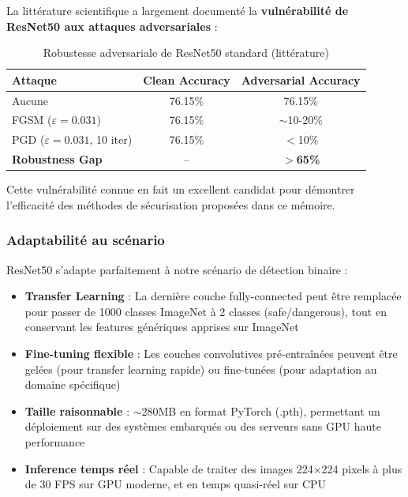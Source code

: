 La littérature scientifique a largement documenté la \textbf{vulnérabilité de ResNet50 aux attaques adversariales} :

\begin{table}[h]
\centering
\caption{Robustesse adversariale de ResNet50 standard (littérature)}
\label{tab:resnet50_vulnerability}
\begin{tabular}{|l|c|c|}
\hline
\textbf{Attaque} & \textbf{Clean Accuracy} & \textbf{Adversarial Accuracy} \\ \hline
Aucune & 76.15\% & 76.15\% \\ \hline
FGSM ($\varepsilon=0.031$) & 76.15\% & $\sim$10-20\% \\ \hline
PGD ($\varepsilon=0.031$, 10 iter) & 76.15\% & $<$10\% \\ \hline
\textbf{Robustness Gap} & -- & \textbf{$>$65\%} \\ \hline
\end{tabular}
\end{table}

Cette vulnérabilité connue en fait un excellent candidat pour démontrer l'efficacité des méthodes de sécurisation proposées dans ce mémoire.


\subsubsection{Adaptabilité au scénario}

ResNet50 s'adapte parfaitement à notre scénario de détection binaire :

\begin{itemize}
    \item \textbf{Transfer Learning} : La dernière couche fully-connected peut être remplacée pour passer de 1000 classes ImageNet à 2 classes (safe/dangerous), tout en conservant les features génériques apprises sur ImageNet
    \item \textbf{Fine-tuning flexible} : Les couches convolutives pré-entraînées peuvent être gelées (pour transfer learning rapide) ou fine-tunées (pour adaptation au domaine spécifique)
    \item \textbf{Taille raisonnable} : $\sim$280MB en format PyTorch (.pth), permettant un déploiement sur des systèmes embarqués ou des serveurs sans GPU haute performance
    \item \textbf{Inference temps réel} : Capable de traiter des images 224×224 pixels à plus de 30 FPS sur GPU moderne, et en temps quasi-réel sur CPU
\end{itemize}




